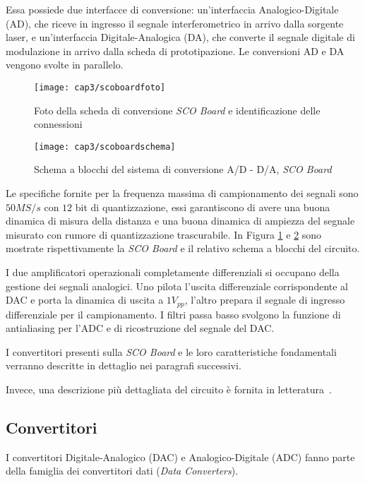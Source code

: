 Essa possiede due interfacce di conversione: un'interfaccia Analogico-Digitale (AD), che riceve in ingresso il segnale interferometrico in arrivo dalla sorgente laser, e un'interfaccia Digitale-Analogica (DA), che converte il segnale digitale di modulazione in arrivo dalla scheda di prototipazione. Le conversioni AD e DA vengono svolte in parallelo.

\begin{figure}  
  \begin{center}
    \texttt{[image: cap3/scoboardfoto]}
    \caption{Foto della scheda di conversione \textit{SCO Board} e identificazione delle connessioni}
    \label{scoboardfoto}
  \end{center}
\end{figure}

\begin{figure}  
  \begin{center}
    \texttt{[image: cap3/scoboardschema]}
    \caption{Schema a blocchi del sistema di conversione A/D - D/A, \textit{SCO Board}}
    \label{scoboardschema}
  \end{center}
\end{figure}

Le specifiche fornite per la frequenza massima di campionamento dei segnali sono $50MS/s$ con $12$ bit di quantizzazione, essi garantiscono di avere una buona dinamica di misura della distanza e una buona dinamica di ampiezza del segnale misurato con rumore di quantizzazione trascurabile. In Figura \ref{scoboardfoto} e \ref{scoboardschema} sono mostrate rispettivamente la \textit{SCO Board} e il relativo schema a blocchi del circuito.

I due amplificatori operazionali completamente differenziali si occupano della gestione dei segnali analogici. Uno pilota l'uscita differenziale corrispondente al DAC e porta la dinamica di uscita a $1V_{pp}$, l'altro prepara il segnale di ingresso differenziale per il campionamento. I filtri passa basso svolgono la funzione di antialiasing per l'ADC e di ricostruzione del segnale del DAC.

I convertitori presenti sulla \textit{SCO Board} e le loro caratteristiche fondamentali verranno descritte in dettaglio nei paragrafi successivi.

Invece, una descrizione più dettagliata del circuito è fornita in letteratura~\cite{thesissmldis}.

\subsection{Convertitori}
I convertitori Digitale-Analogico (DAC) e Analogico-Digitale (ADC) fanno parte della famiglia dei convertitori dati (\textit{Data Converters}).

